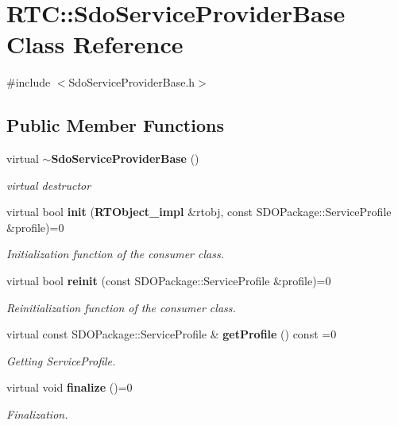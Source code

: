 \section{RTC::SdoServiceProviderBase Class Reference}
\label{classRTC_1_1SdoServiceProviderBase}


{\ttfamily \#include $<$SdoServiceProviderBase.h$>$}

\subsection*{Public Member Functions}
\begin{DoxyCompactItemize}
\item 
virtual {\bf $\sim$SdoServiceProviderBase} ()
\begin{DoxyCompactList}\small\item\em virtual destructor \item\end{DoxyCompactList}\item 
virtual bool {\bf init} ({\bf RTObject\_\-impl} \&rtobj, const SDOPackage::ServiceProfile \&profile)=0
\begin{DoxyCompactList}\small\item\em Initialization function of the consumer class. \item\end{DoxyCompactList}\item 
virtual bool {\bf reinit} (const SDOPackage::ServiceProfile \&profile)=0
\begin{DoxyCompactList}\small\item\em Reinitialization function of the consumer class. \item\end{DoxyCompactList}\item 
virtual const SDOPackage::ServiceProfile \& {\bf getProfile} () const =0
\begin{DoxyCompactList}\small\item\em Getting ServiceProfile. \item\end{DoxyCompactList}\item 
virtual void {\bf finalize} ()=0
\begin{DoxyCompactList}\small\item\em Finalization. \item\end{DoxyCompactList}\end{DoxyCompactItemize}


